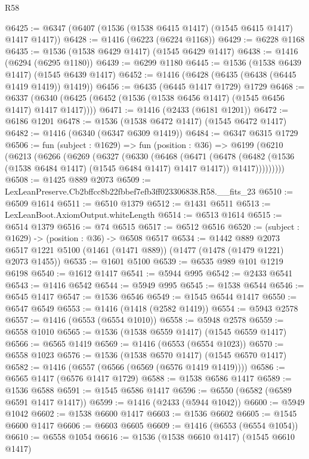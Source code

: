 \begin{lexlean}{R58}
\begin{coremodule}
{{@6425 := @6347 (@6407 (@1536 (@1538 @6415 @1417) (@1545 @6415 @1417) @1417 @1417))
@6428 := @1416 (@6223 (@6224 @1168))
@6429 := @6228 @1168
@6435 := @1536 (@1538 @6429 @1417) (@1545 @6429 @1417)
@6438 := @1416 (@6294 (@6295 @1180))
@6439 := @6299 @1180
@6445 := @1536 (@1538 @6439 @1417) (@1545 @6439 @1417)
@6452 := @1416 (@6428 (@6435 (@6438 (@6445 @1419 @1419)) @1419))
@6456 := @6435 (@6445 @1417 @1729) @1729
@6468 := @6337 (@6340 (@6425 (@6452 (@1536 (@1538 @6456 @1417) (@1545 @6456 @1417) @1417 @1417))))
@6471 := @1416 (@2433 (@6181 @1201))
@6472 := @6186 @1201
@6478 := @1536 (@1538 @6472 @1417) (@1545 @6472 @1417)
@6482 := @1416 (@6340 (@6347 @6309 @1419))
@6484 := @6347 @6315 @1729
@6506 := fun (subject : @1629) =>
  fun (position : @36) =>
  @6199
    (@6210
      (@6213
        (@6266
          (@6269
            (@6327
              (@6330
                (@6468
                  (@6471
                    (@6478
                      (@6482 (@1536 (@1538 @6484 @1417) (@1545 @6484 @1417) @1417 @1417))
                      @1417)))))))))
@6508 := @1425 @889 @2073
@6509 := LexLeanPreserve.Cb2bffcc8b22fbbef7efb3ff023306838.R58.__fits_23
@6510 := @6509 @1614
@6511 := @6510 @1379
@6512 := @1431 @6511
@6513 := LexLeanBoot.AxiomOutput.whiteLength
@6514 := @6513 @1614
@6515 := @6514 @1379
@6516 := @74 @6515
@6517 := @6512 @6516
@6520 := (subject : @1629) -> (position : @36) -> @6508 @6517
@6534 := @1442
    @889
    @2073
    @6517
    @1221
    @5100
    (@1461 (@1471 @889))
    (@1477 (@1478 (@1479 @1221) @2073 @1455))
@6535 := @1601 @5100
@6539 := @6535 @989 @101 @1219 @6198
@6540 := @1612 @1417
@6541 := @5944 @995
@6542 := @2433 @6541
@6543 := @1416 @6542
@6544 := @5949 @995
@6545 := @1538 @6544
@6546 := @6545 @1417
@6547 := @1536 @6546
@6549 := @1545 @6544 @1417
@6550 := @6547 @6549
@6553 := @1416 (@1418 (@2582 @1419))
@6554 := @5943 @2578
@6557 := @1416 (@6553 (@6554 @1010))
@6558 := @5948 @2578
@6559 := @6558 @1010
@6565 := @1536 (@1538 @6559 @1417) (@1545 @6559 @1417)
@6566 := @6565 @1419
@6569 := @1416 (@6553 (@6554 @1023))
@6570 := @6558 @1023
@6576 := @1536 (@1538 @6570 @1417) (@1545 @6570 @1417)
@6582 := @1416 (@6557 (@6566 (@6569 (@6576 @1419 @1419))))
@6586 := @6565 @1417 (@6576 @1417 @1729)
@6588 := @1538 @6586 @1417
@6589 := @1536 @6588
@6591 := @1545 @6586 @1417
@6596 := @6550 (@6582 (@6589 @6591 @1417 @1417))
@6599 := @1416 (@2433 (@5944 @1042))
@6600 := @5949 @1042
@6602 := @1538 @6600 @1417
@6603 := @1536 @6602
@6605 := @1545 @6600 @1417
@6606 := @6603 @6605
@6609 := @1416 (@6553 (@6554 @1054))
@6610 := @6558 @1054
@6616 := @1536 (@1538 @6610 @1417) (@1545 @6610 @1417)
}}
\end{coremodule}
\end{lexlean}
